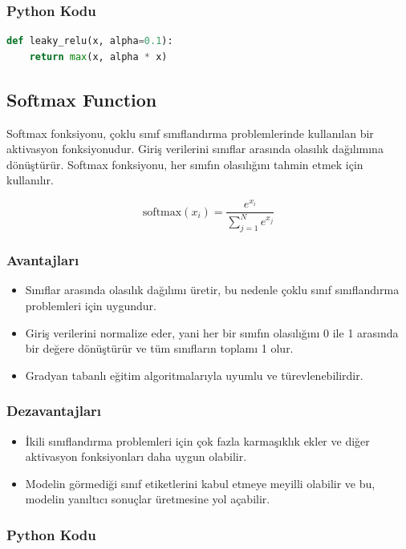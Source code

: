 \subsubsection{Python Kodu}

\begin{lstlisting}[language=Python]
def leaky_relu(x, alpha=0.1):
    return max(x, alpha * x)
\end{lstlisting}

\newpage

\subsection{Softmax Function}
Softmax fonksiyonu, çoklu sınıf sınıflandırma problemlerinde kullanılan bir aktivasyon fonksiyonudur. Giriş verilerini sınıflar arasında olasılık dağılımına dönüştürür. Softmax fonksiyonu, her sınıfın olasılığını tahmin etmek için kullanılır.

\[\text{softmax}(x_i) = \frac{e^{x_i}}{\sum_{j=1}^{N} e^{x_j}}\]

\subsubsection{Avantajları}
\begin{itemize}
    \item Sınıflar arasında olasılık dağılımı üretir, bu nedenle çoklu sınıf sınıflandırma problemleri için uygundur.
    \item Giriş verilerini normalize eder, yani her bir sınıfın olasılığını 0 ile 1 arasında bir değere dönüştürür ve tüm sınıfların toplamı 1 olur.
    \item Gradyan tabanlı eğitim algoritmalarıyla uyumlu ve türevlenebilirdir.
\end{itemize}

\subsubsection{Dezavantajları}
\begin{itemize}
    \item İkili sınıflandırma problemleri için çok fazla karmaşıklık ekler ve diğer aktivasyon fonksiyonları daha uygun olabilir.
    \item Modelin görmediği sınıf etiketlerini kabul etmeye meyilli olabilir ve bu, modelin yanıltıcı sonuçlar üretmesine yol açabilir.
\end{itemize}

\subsubsection{Python Kodu}

